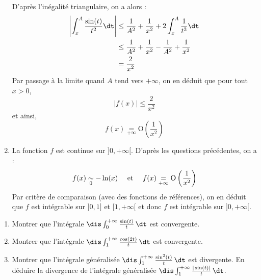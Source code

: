 \documentclass[a4paper,10pt]{report}
\begin{document}
\begin{enumerate}
\begin{align*}
  \end{align*}
 D'après l'inégalité triangulaire, on a alors :
 \begin{align*}
 \left\vert  \int_{x}^A \dfrac{\sin(t)}{t^2} \dt \right\vert & \leq \dfrac{1}{A^2} + \dfrac{1}{x^2} + 2 \int_{x}^A \dfrac{1}{t^3} \dt  \\
 & \leq \dfrac{1}{A^2} + \dfrac{1}{x^2} - \dfrac{1}{A^2} + \dfrac{1}{x^2}  \\
 & = \dfrac{2}{x^2}
 \end{align*}
 Par passage à la limite quand $A$ tend vers $+ \infty$, on en déduit que pour tout $x>0$,
 $$ \vert f(x) \vert \leq \dfrac{2}{x^2}$$
 et ainsi,
$$f(x) \underset{+ \infty}{=} \textrm{O} \left( \dfrac{1}{x^2} \right) $$
\item La fonction $f$ est continue sur $]0, + \infty[$. D'après les questions précédentes, on a :
$$ f(x) \underset{0}{\sim} -\ln(x) \quad \hbox{ et } \quad f(x) \underset{+ \infty}{=} \textrm{O} \left( \dfrac{1}{x^2} \right)$$
Par critère de comparaison (avec des fonctions de références), on en déduit que $f$ est intégrable sur $]0,1]$ et $[1, + \infty[$ et donc $f$ est intégrable sur $]0, + \infty[$.
\end{enumerate}

\begin{Exa} \begin{enumerate}
\item Montrer que l'int\'egrale $\dis \int_0^{+ \infty} \frac{\sin(t)}{t}\, \dt$ est convergente.
\item Montrer que l'int\'egrale $\dis \int_1^{+\infty}\frac{\cos(2t)}{t}\, \dt$ est convergente.
\item Montrer que l'int\'egrale g\'en\'eralis\'ee $\dis \int_1^{+\infty}\frac{\sin^2(t)}{t} \, \dt$ est divergente. En d\'eduire la divergence de l'int\'egrale g\'en\'eralis\'ee $\dis \int_1^{+\infty}\frac{|\sin(t)|}{t} \, \dt$.
\end{enumerate}
\end{Exa}
\end{document}

